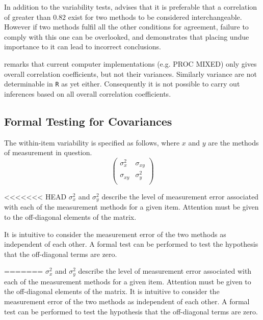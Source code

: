 \documentclass[12pt, a4paper]{report}
\theoremstyle{plain}
\theoremstyle{definition}
\theoremstyle{remark}
\begin{document}
In addition to the variability tests, \citet{ARoy2009} advises that it is preferable that a correlation of greater than $0.82$ exist for two methods to be considered interchangeable. However if two methods fulfil all the other conditions for agreement, failure to comply with this one can be overlooked, and demonstrates that placing undue importance to it can lead to incorrect conclusions.

\citet{ARoy2009} remarks that current computer implementations (e.g. PROC MIXED) only gives overall correlation coefficients, but not their variances. Similarly variance are not determinable in \texttt{R} as yet either. Consequently it is not possible to carry out inferences based on all overall correlation coefficients.
\subsection{Formal Testing for Covariances} %

The within-item variability is specified as follows, where $x$ and $y$ are the methods of measurement in question.
\[ \left(
\begin{array}{cc}
\sigma^2_x & \sigma_{xy} \\
\sigma_{xy} & \sigma^2_y \\
\end{array}
\right)
\]

<<<<<<< HEAD
$\sigma^2_x$ and $\sigma^2_y$ describe the level of measurement error associated with each of the measurement methods for a given item. Attention must be given to the off-diagonal elements of the matrix. 

It is intuitive to consider the measurement error of the two methods as independent of each other. A formal test can be performed to test the hypothesis that the off-diagonal terms are zero.

=======
$\sigma^2_x$ and $\sigma^2_y$ describe the level of measurement error associated with each of the measurement methods for a given item. Attention must be given to the off-diagonal elements of the matrix. It is intuitive to consider the measurement error of the two methods as independent of each other. A formal test can be performed to test the hypothesis that the off-diagonal terms are zero.
\end{document}

